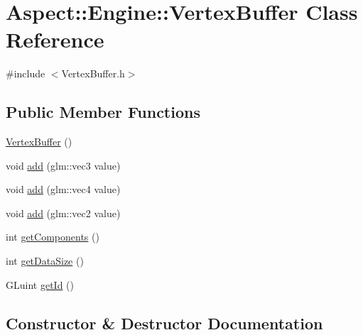 \hypertarget{class_aspect_1_1_engine_1_1_vertex_buffer}{}\section{Aspect\+:\+:Engine\+:\+:Vertex\+Buffer Class Reference}
\label{class_aspect_1_1_engine_1_1_vertex_buffer}


{\ttfamily \#include $<$Vertex\+Buffer.\+h$>$}

\subsection*{Public Member Functions}
\begin{DoxyCompactItemize}
\item 
\mbox{\hyperlink{class_aspect_1_1_engine_1_1_vertex_buffer_a5d5528d9e3692c8011a165119b78050e}{Vertex\+Buffer}} ()
\item 
void \mbox{\hyperlink{class_aspect_1_1_engine_1_1_vertex_buffer_a4fb009bcbc95ee2db02630dd4b4b5540}{add}} (glm\+::vec3 value)
\item 
void \mbox{\hyperlink{class_aspect_1_1_engine_1_1_vertex_buffer_a8aaf8b66be2c477e198db444462bf6be}{add}} (glm\+::vec4 value)
\item 
void \mbox{\hyperlink{class_aspect_1_1_engine_1_1_vertex_buffer_a57c894018bcc1043b56ac754c591be2d}{add}} (glm\+::vec2 value)
\item 
int \mbox{\hyperlink{class_aspect_1_1_engine_1_1_vertex_buffer_a27e5234fb72c760afa8dc5772305c550}{get\+Components}} ()
\item 
int \mbox{\hyperlink{class_aspect_1_1_engine_1_1_vertex_buffer_ac0e2ba734fc01ab53ac55b4f906a9e86}{get\+Data\+Size}} ()
\item 
G\+Luint \mbox{\hyperlink{class_aspect_1_1_engine_1_1_vertex_buffer_a5550514e2062b822cd6808662bc126b5}{get\+Id}} ()
\end{DoxyCompactItemize}


\subsection{Constructor \& Destructor Documentation}
\mbox{\label{class_aspect_1_1_engine_1_1_vertex_buffer_a5d5528d9e3692c8011a165119b78050e}} 
